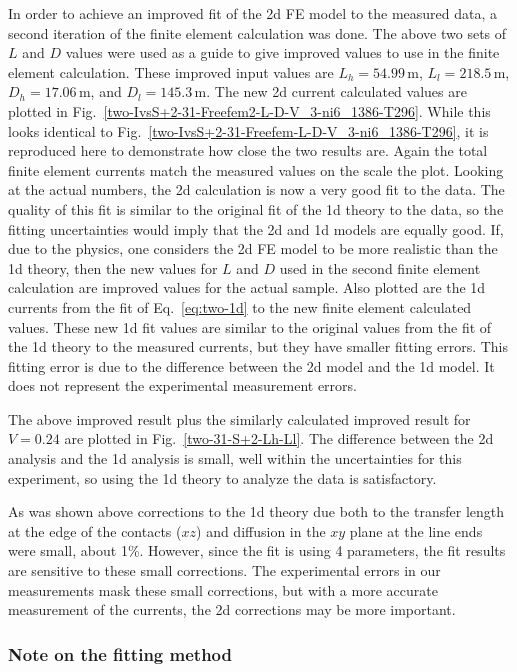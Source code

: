 In order to achieve an improved  fit of the 2d FE model to the measured data,
a second iteration of the finite element calculation was done.
The above two sets of $L$ and $D$ values were used as a guide to give
 improved values to use in the finite
element calculation.  These improved input values are
$L_h=54.99$\,\textmu m, $L_l=218.5$\,\textmu m,
 $D_h=17.06$\,\textmu m, and $D_l=145.3$\,\textmu m.
The new 2d current calculated values are plotted in
Fig.~\ref{two-IvsS+2-31-Freefem2-L-D-V_3-ni6_1386-T296}.
While this looks identical to Fig.~\ref{two-IvsS+2-31-Freefem-L-D-V_3-ni6_1386-T296},
it is reproduced here to demonstrate how close the two results are.
Again the total finite element currents match the measured values
on the scale the plot.  Looking at the actual numbers,
the 2d calculation is now a very good fit to the data. 
The quality of this fit is similar to the original fit of the 1d
theory to the data, so the fitting uncertainties would imply that
the 2d and 1d models are equally good.
If, due to the physics, one considers the 2d FE model to be more realistic
 than the 1d theory,
then the new values for $L$ and $D$ used in the second finite element
calculation are improved values for the actual sample.
Also plotted are the 1d currents from the fit of Eq.~\ref{eq:two-1d}
 to the new finite element calculated values.
These new 1d fit values are similar to the original values from the fit of the
1d theory to the measured currents, but they have smaller fitting
errors.  This fitting error is due to the difference between the 2d
 model and the 1d model. It does not represent the experimental
measurement errors.

The above improved result plus the similarly calculated improved result
for $V=0.24$ are plotted in Fig.~\ref{two-31-S+2-Lh-Ll}.
 The difference between the 2d analysis and the 1d analysis is small,
 well within the
uncertainties for this experiment, so using the 1d theory to
analyze the data is satisfactory.

As was shown above corrections to the 1d theory due both to the
transfer length at the edge of the contacts ($xz$) and diffusion
 in the $xy$ plane at the line
ends were small, about 1\%.
However, since the fit is using 4 parameters, the fit results are
sensitive to these small corrections.  The experimental errors
in our measurements mask these small corrections, but with a
more accurate measurement of the currents, the 2d corrections may
be more important.

   \subsubsection{Note on the fitting method}

